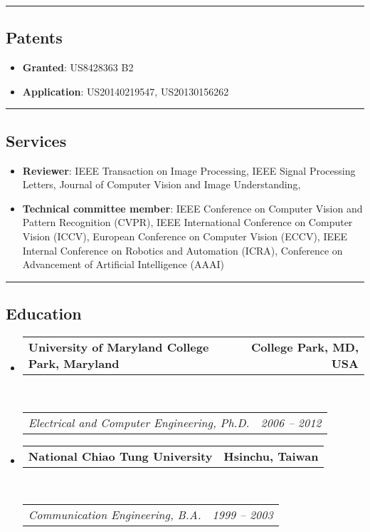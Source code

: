 \documentclass[10pt,letterpaper]{article}
\makeatletter
\newcommand{\headerrow}[2]
{\begin{tabular*}{\linewidth}{l@{\extracolsep{\fill}}r}
	#1 &
	#2 \\
\end{tabular*}}
\makeatother
\begin{document}
\hrule
\vspace{-0.4em}
\subsection*{Patents}
\begin{itemize}
\item {\bf Granted}: US8428363 B2\vspace{-2mm}
\item {\bf Application}: US20140219547, US20130156262\vspace{-2mm}
\end{itemize}

\hrule
\vspace{-0.4em}
\subsection*{Services}
\begin{itemize}
\item {\bf Reviewer}: IEEE Transaction on Image Processing, IEEE Signal Processing Letters, Journal of Computer Vision and Image Understanding, \vspace{-2mm}
\item {\bf Technical committee member}: IEEE Conference on Computer Vision and Pattern Recognition (CVPR), IEEE International Conference on Computer Vision (ICCV), European Conference on Computer Vision (ECCV), IEEE Internal Conference on Robotics and Automation (ICRA), Conference on Advancement of Artificial Intelligence (AAAI)\vspace{-2mm}
\end{itemize}

\hrule
\vspace{-0.4em}
\subsection*{Education}

\begin{itemize}
	\parskip=0.1em

	\item
	\headerrow
		{\textbf{University of Maryland College Park, Maryland}}
		{\textbf{College Park, MD, USA}}
	\\
	\headerrow
		{\emph{Electrical and Computer Engineering, Ph.D.}}
		{\emph{2006 -- 2012}}
	\item
	\headerrow
		{\textbf{National Chiao Tung University}}
		{\textbf{Hsinchu, Taiwan}}
	\\
	\headerrow
		{\emph{Communication Engineering, B.A.}}
		{\emph{1999 -- 2003}}

\end{itemize}
\end{document}
